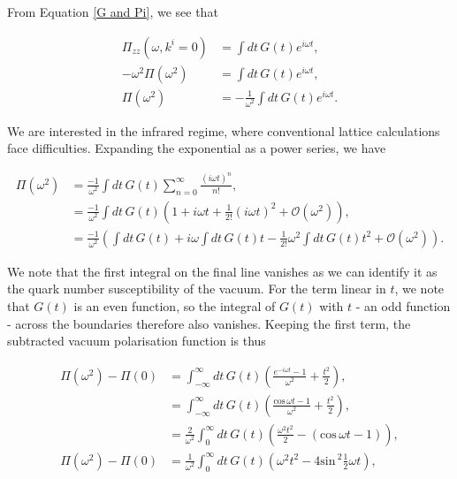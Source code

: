 \documentclass{article}
\numberwithin{equation}{section} %
\begin{document}
\noindent From Equation \ref{G and Pi}, we see that 

\begin{equation}
\begin{split}
\Pi_{zz}(\omega,k^i=0)&= \int dt \, G(t) e^{i\omega t},\\
-\omega^2\Pi(\omega^2)&= \int dt \, G(t) e^{i\omega t},\\
\Pi(\omega^2)&= -\frac{1}{\omega^2}\int dt \, G(t) e^{i\omega t}.
\end{split}
\end{equation}

We are interested in the infrared regime, where conventional lattice calculations face difficulties. Expanding the exponential as a power series, we have

\begin{equation}
\begin{split}
\Pi(\omega^2)&= \frac{-1}{\omega^2}\int dt \, G(t) \sum_{n=0}^\infty \frac{(i\omega t)^n}{n!},\\
&= \frac{-1}{\omega^2}\int dt \, G(t) \left(1 +i\omega t+\frac{1}{2!}(i\omega t)^2 + \mathcal{O}(\omega^2) \right),\\
&= \frac{-1}{\omega^2} \left(\int dt \, G(t) + i\omega \int dt \, G(t)t-\frac{1}{2!}\omega^2 \int dt \, G(t)t^2 + \mathcal{O}(\omega^2) \right).
\end{split}
\end{equation}

\noindent We note that the first integral on the final line vanishes as we can identify it as the quark number susceptibility of the vacuum. For the term linear in $t$, we note that $G(t)$ is an even function, so the integral of $G(t)$ with $t$ - an odd function - across the boundaries therefore also vanishes. Keeping the first term, the subtracted vacuum polarisation function is thus

\begin{equation}
\begin{split}
\Pi(\omega^2)-\Pi(0) &= \int^\infty_{-\infty} dt \, G(t) \left( \frac{e^{-i\omega t} - 1}{\omega^2} + \frac{t^2}{2}\right),\\
&=\int^\infty_{-\infty} dt \, G(t) \left( \frac{\mathrm{cos\,} \omega t - 1}{\omega^2} + \frac{t^2}{2}\right),\\
&=\frac{2}{\omega^2}\int^\infty_0dt \, G(t) \left( \frac{\omega^2t^2}{2}-(\mathrm{cos\,} \omega t- 1) \right),\\
\Pi(\omega^2)-\Pi(0) &=\frac{1}{\omega^2}\int^\infty_0dt \, G(t) \left( \omega^2t^2-4\mathrm{sin\,}^2 \frac{1}{2}\omega t \right),
\end{split}
\end{equation}
\end{document}
